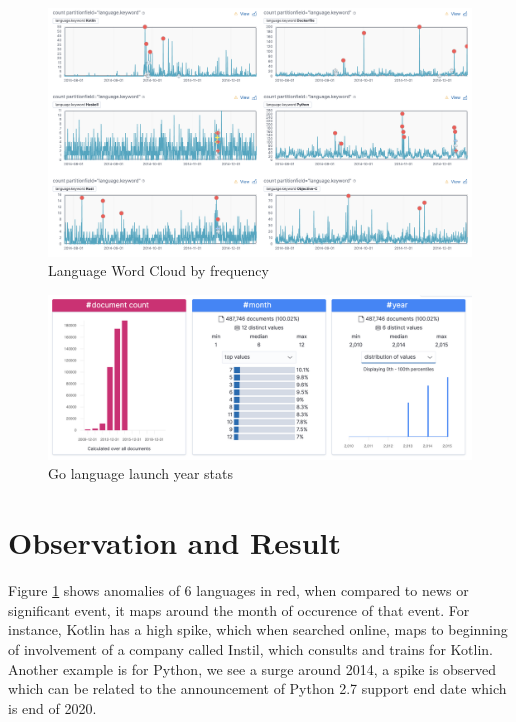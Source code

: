 \documentclass[12pt,conference]{IEEEtran}
\begin{document}
\begin{figure}[ht]
  \centering
  \includegraphics[width=16cm]{tsanomaly.png}
  \caption{Language Word Cloud by frequency}
  \label{fig:anomaly}
\end{figure}

\begin{figure}[ht]
  \centering
  \includegraphics[width=16cm]{golaunchyear.png}
  \caption{Go language launch year stats}
  \label{fig:gyl}
\end{figure}

\section{Observation and Result}

Figure \ref{fig:anomaly} shows anomalies of 6 languages in red, when compared to news or significant event, it maps around the month of occurence of that event. For instance, Kotlin has a high spike, which when searched online, maps to beginning of involvement of a company called Instil, which consults and trains for Kotlin. Another example is for Python, we see a surge around 2014, a spike is observed which can be related to the announcement of Python 2.7 support end date which is end of 2020.
\end{document}
